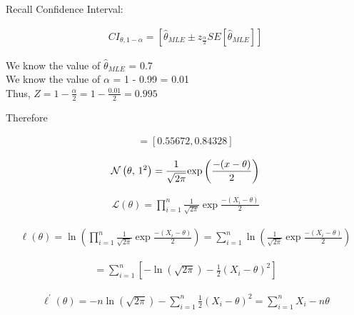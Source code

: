\documentclass[12pt]{article}
\begin{document}
\begin{enumerate}

Recall Confidence Interval:

\begin{align*}
 CI_{\theta, 1 - \alpha} = [\hat\theta_{MLE} \pm z_{\frac{\alpha}{2}}SE[\hat\theta_{MLE}]]
\end{align*}

We know the value of $\hat\theta_{MLE}$ = 0.7 \\
We know the value of $\alpha$ = 1 - 0.99 = 0.01 \\ 
Thus, $Z = 1 - \frac{\alpha}{2} = 1 - \frac{0.01}{2} = 0.995$

Therefore

    \begin{align*}
        [0.7 - (0.995)(0.144), 0.7 + (0.995)(0.144)] = [0.55672, 0.84328]
    \end{align*}





\begin{align*}
    \mathcal{N}\left(\theta,\,1^2\right) = \frac{1}{\sqrt{2\pi}}\mathrm{exp}\left(\frac{-(x - \theta)}{2}\right) 
\end{align*}


\begin{align*}
    \mathcal{L}(\theta) = \prod\limits_{i = 1}^{n}\frac{1}{\sqrt{2\pi}}\exp{\frac{-(X_{i} - \theta)}{2}}
\end{align*}

\begin{align*}
    \ell(\theta) = \ln(\prod\limits_{i=1}^{n}\frac{1}{\sqrt{2\pi}}\exp{\frac{-(X_{i} - \theta)}{2}}) = \sum\limits_{i = 1}^{n}\ln(\frac{1}{\sqrt{2\pi}}\exp{\frac{-(X_{i} - \theta)}{2}})
\end{align*}

\begin{align*}
    = \sum\limits_{i=1}^{n}[-\ln(\sqrt{2\pi}) - \frac{1}{2}(X_i - \theta)^2]
\end{align*}

\begin{align*}
    \ell^{\prime}(\theta) = -n\ln(\sqrt{2\pi}) - \sum\limits_{i=1}^{n}\frac{1}{2}(X_i - \theta)^{2} = \sum\limits_{i=1}^{n}X_{i} - n\theta
\end{align*}


\end{enumerate}
\end{document}
